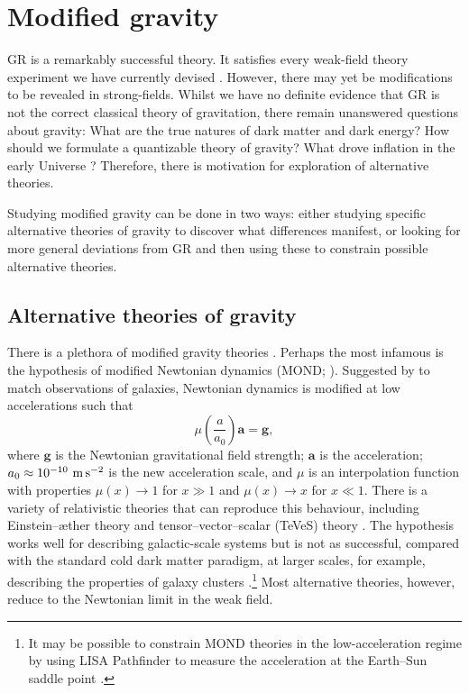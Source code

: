 \section{Modified gravity}\label{sec:alternative}

GR is a remarkably successful theory. It satisfies every weak-field theory experiment we have currently devised \citep{Will2006}. However, there may yet be modifications to be revealed in strong-fields. Whilst we have no definite evidence that GR is not the correct classical theory of gravitation, there remain unanswered questions about gravity: What are the true natures of dark matter and dark energy? How should we formulate a quantizable theory of gravity? What drove inflation in the early Universe \citep{Guth1981,Lyth1999}? Therefore, there is motivation for exploration of alternative theories.

Studying modified gravity can be done in two ways: either studying specific alternative theories of gravity to discover what differences manifest, or looking for more general deviations from GR and then using these to constrain possible alternative theories.

\subsection{Alternative theories of gravity}

There is a plethora of modified gravity theories \citep{Clifton2012}. Perhaps the most infamous is the hypothesis of modified Newtonian dynamics (MOND; \citealt{Famaey2012}). Suggested by \citet{Milgrom1983a,Milgrom1983b,Milgrom1983c} to match observations of galaxies, Newtonian dynamics is modified at low accelerations such that
\begin{equation}
\mu\left(\dfrac{a}{a_0}\right)\boldsymbol{a} = \boldsymbol{g},
\end{equation}
where $\boldsymbol{g}$ is the Newtonian gravitational field strength; $\boldsymbol{a}$ is the acceleration; $a_0 \approx 10^{-10}~\mathrm{m\,s^{-2}}$ is the new acceleration scale, and $\mu$ is an interpolation function with properties $\mu(x) \rightarrow 1$ for $x \gg 1$ and $\mu(x) \rightarrow x$ for $x \ll 1$. There is a variety of relativistic theories that can reproduce this behaviour, including Einstein--\ae{}ther theory and tensor--vector--scalar (TeVeS) theory \citep{Bekenstein2006}. The hypothesis works well for describing galactic-scale systems but is not as successful, compared with the standard cold dark matter paradigm, at larger scales, for example, describing the properties of galaxy clusters \citep{Aguirre2001,Angus2007}.\footnote{It may be possible to constrain MOND theories in the low-acceleration regime by using LISA Pathfinder to measure the acceleration at the Earth--Sun saddle point \citep{Magueijo2011,Galianni2011}.} Most alternative theories, however, reduce to the Newtonian limit in the weak field.

